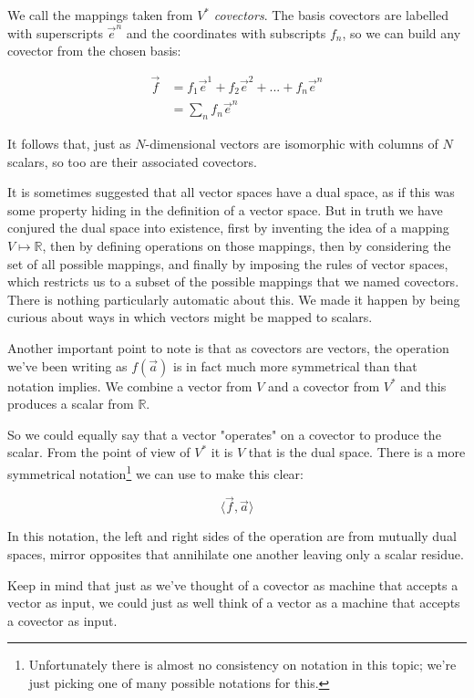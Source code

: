 We call the mappings taken from $V^*$ \textit{covectors}. The basis covectors are labelled with superscripts $\vec{e}^n$ and the coordinates with subscripts $f_n$, so we can build any covector from the chosen basis:

\begin{equation}
    \begin{split}
    \vec{f} &= f_1 \vec{e}^1 + f_2 \vec{e}^2 + ... + f_n \vec{e}^n \\
            &= \sum_n f_n \vec{e}^n
    \end{split}
\end{equation}

It follows that, just as $N$-dimensional vectors are isomorphic with columns of $N$ scalars, so too are their associated covectors.

It is sometimes suggested that all vector spaces have a dual space, as if this was some property hiding in the definition of a vector space. But in truth we have conjured the dual space into existence, first by inventing the idea of a mapping $V \mapsto \mathbb{R}$, then by defining operations on those mappings, then by considering the set of all possible mappings, and finally by imposing the rules of vector spaces, which restricts us to a subset of the possible mappings that we named covectors. There is nothing particularly automatic about this. We made it happen by being curious about ways in which vectors might be mapped to scalars.

Another important point to note is that as covectors are vectors, the operation we've been writing as $f(\vec{a})$ is in fact much more symmetrical than that notation implies. We combine a vector from $V$ and a covector from $V^*$ and this produces a scalar from $\mathbb{R}$. 

So we could equally say that a vector "operates" on a covector to produce the scalar. From the point of view of $V^*$ it is $V$ that is the dual space. There is a more symmetrical notation\footnote{Unfortunately there is almost no consistency on notation in this topic; we're just picking one of many possible notations for this.} we can use to make this clear:

$$\langle \vec{f},\vec{a}\rangle$$

In this notation, the left and right sides of the operation are from mutually dual spaces, mirror opposites that annihilate one another leaving only a scalar residue.

Keep in mind that just as we've thought of a covector as machine that accepts a vector as input, we could just as well think of a vector as a machine that accepts a covector as input.

